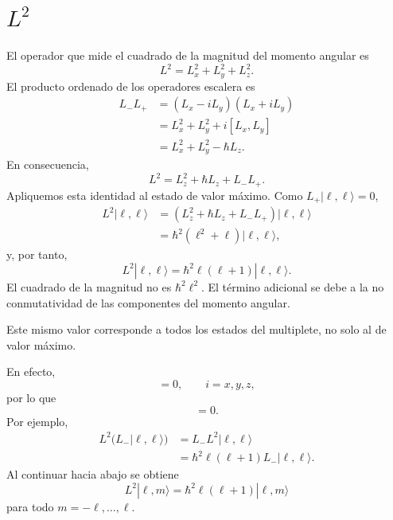 \section{\texorpdfstring{\(L^2\)}{El valor común de }}

El operador que mide el cuadrado de la magnitud del momento angular es
\begin{equation}
L^2=L_x^2+L_y^2+L_z^2.
\end{equation}
El producto ordenado de los operadores escalera es
\begin{align}
L_-L_+
&=(L_x-iL_y)(L_x+iL_y) \\
&=L_x^2+L_y^2+i[L_x,L_y] \\
&=L_x^2+L_y^2-\hbar L_z.
\end{align}
En consecuencia,
\begin{equation}
L^2=L_z^2+\hbar L_z+L_-L_+.
\end{equation}
Apliquemos esta identidad al estado de valor máximo. Como \(L_+|\ell,\ell\rangle=0\),
\begin{align}
L^2|\ell,\ell\rangle
&=\left(L_z^2+\hbar L_z+L_-L_+\right)|\ell,\ell\rangle \\
&=\hbar^2\left(\ell^2+\ell\right)|\ell,\ell\rangle,
\end{align}
y, por tanto,
\begin{equation}
L^2|\ell,\ell\rangle
=\hbar^2\ell(\ell+1)|\ell,\ell\rangle.
\end{equation}
El cuadrado de la magnitud no es \(\hbar^2\ell^2\). El término adicional se debe a la no conmutatividad de las componentes del momento angular.

Este mismo valor corresponde a todos los estados del multiplete, no solo al de valor máximo.

\begin{classroomqa}
\end{classroomqa}

En efecto,
\begin{equation}
[L^2,L_i]=0,
\qquad i=x,y,z,
\end{equation}
por lo que
\begin{equation}
[L^2,L_\pm]=0.
\end{equation}
Por ejemplo,
\begin{align}
L^2\bigl(L_-|\ell,\ell\rangle\bigr)
&=L_-L^2|\ell,\ell\rangle \\
&=\hbar^2\ell(\ell+1)L_-|\ell,\ell\rangle.
\end{align}
Al continuar hacia abajo se obtiene
\begin{equation}
L^2|\ell,m\rangle
=\hbar^2\ell(\ell+1)|\ell,m\rangle
\end{equation}
para todo \(m=-\ell,\ldots,\ell\).

